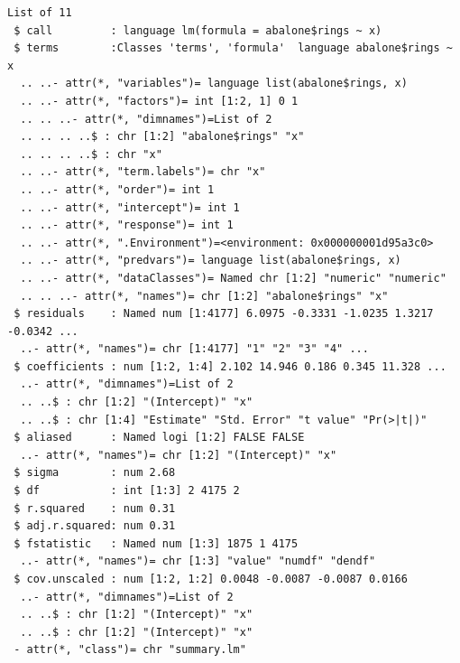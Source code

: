 \documentclass[
  11pt,
]{krantz}
\newenvironment{Shaded}{\begin{snugshade}}{\end{snugshade}}
\newcommand{\CommentTok}[1]{\textcolor[rgb]{0.37,0.37,0.37}{\textit{#1}}}
\newcommand{\ControlFlowTok}[1]{\textcolor[rgb]{0.27,0.27,0.27}{\textbf{#1}}}
\newcommand{\DecValTok}[1]{\textcolor[rgb]{0.06,0.06,0.06}{#1}}
\newcommand{\KeywordTok}[1]{\textcolor[rgb]{0.27,0.27,0.27}{\textbf{#1}}}
\newcommand{\NormalTok}[1]{#1}
\newcommand{\OperatorTok}[1]{\textcolor[rgb]{0.43,0.43,0.43}{\textbf{#1}}}
\newcommand{\StringTok}[1]{\textcolor[rgb]{0.5,0.5,0.5}{#1}}
\begin{document}
\footnotesize

\begin{Shaded}
\end{Shaded}

\begin{verbatim}
List of 11
 $ call         : language lm(formula = abalone$rings ~ x)
 $ terms        :Classes 'terms', 'formula'  language abalone$rings ~ x
  .. ..- attr(*, "variables")= language list(abalone$rings, x)
  .. ..- attr(*, "factors")= int [1:2, 1] 0 1
  .. .. ..- attr(*, "dimnames")=List of 2
  .. .. .. ..$ : chr [1:2] "abalone$rings" "x"
  .. .. .. ..$ : chr "x"
  .. ..- attr(*, "term.labels")= chr "x"
  .. ..- attr(*, "order")= int 1
  .. ..- attr(*, "intercept")= int 1
  .. ..- attr(*, "response")= int 1
  .. ..- attr(*, ".Environment")=<environment: 0x000000001d95a3c0> 
  .. ..- attr(*, "predvars")= language list(abalone$rings, x)
  .. ..- attr(*, "dataClasses")= Named chr [1:2] "numeric" "numeric"
  .. .. ..- attr(*, "names")= chr [1:2] "abalone$rings" "x"
 $ residuals    : Named num [1:4177] 6.0975 -0.3331 -1.0235 1.3217 -0.0342 ...
  ..- attr(*, "names")= chr [1:4177] "1" "2" "3" "4" ...
 $ coefficients : num [1:2, 1:4] 2.102 14.946 0.186 0.345 11.328 ...
  ..- attr(*, "dimnames")=List of 2
  .. ..$ : chr [1:2] "(Intercept)" "x"
  .. ..$ : chr [1:4] "Estimate" "Std. Error" "t value" "Pr(>|t|)"
 $ aliased      : Named logi [1:2] FALSE FALSE
  ..- attr(*, "names")= chr [1:2] "(Intercept)" "x"
 $ sigma        : num 2.68
 $ df           : int [1:3] 2 4175 2
 $ r.squared    : num 0.31
 $ adj.r.squared: num 0.31
 $ fstatistic   : Named num [1:3] 1875 1 4175
  ..- attr(*, "names")= chr [1:3] "value" "numdf" "dendf"
 $ cov.unscaled : num [1:2, 1:2] 0.0048 -0.0087 -0.0087 0.0166
  ..- attr(*, "dimnames")=List of 2
  .. ..$ : chr [1:2] "(Intercept)" "x"
  .. ..$ : chr [1:2] "(Intercept)" "x"
 - attr(*, "class")= chr "summary.lm"
\end{verbatim}
\end{document}
